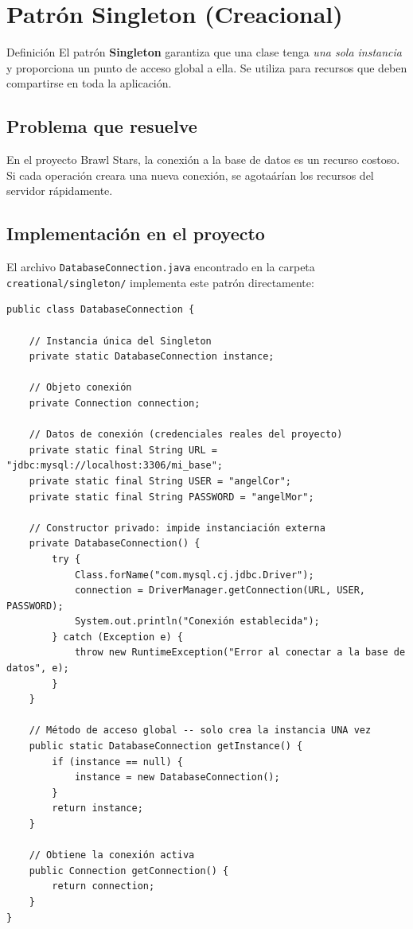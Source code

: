 \documentclass[12pt,a4paper]{article}
\begin{document}
\newpage
\section{Patr\'on Singleton (Creacional)}

\begin{patronbox}{Definici\'on}
El patr\'on \textbf{Singleton} garantiza que una clase tenga \textit{una sola instancia} y proporciona un punto de acceso global a ella. Se utiliza para recursos que deben compartirse en toda la aplicaci\'on.
\end{patronbox}

\subsection{Problema que resuelve}

En el proyecto Brawl Stars, la conexi\'on a la base de datos es un recurso costoso. Si cada operaci\'on creara una nueva conexi\'on, se agota\'ar\'ian los recursos del servidor r\'apidamente.

\subsection{Implementaci\'on en el proyecto}

El archivo \texttt{DatabaseConnection.java} encontrado en la carpeta \texttt{creational/singleton/} implementa este patr\'on directamente:

\begin{lstlisting}[caption={DatabaseConnection.java -- Singleton de conexi\'on a base de datos}]
public class DatabaseConnection {

    // Instancia única del Singleton
    private static DatabaseConnection instance;

    // Objeto conexión
    private Connection connection;

    // Datos de conexión (credenciales reales del proyecto)
    private static final String URL = "jdbc:mysql://localhost:3306/mi_base";
    private static final String USER = "angelCor";
    private static final String PASSWORD = "angelMor";

    // Constructor privado: impide instanciación externa
    private DatabaseConnection() {
        try {
            Class.forName("com.mysql.cj.jdbc.Driver");
            connection = DriverManager.getConnection(URL, USER, PASSWORD);
            System.out.println("Conexión establecida");
        } catch (Exception e) {
            throw new RuntimeException("Error al conectar a la base de datos", e);
        }
    }

    // Método de acceso global -- solo crea la instancia UNA vez
    public static DatabaseConnection getInstance() {
        if (instance == null) {
            instance = new DatabaseConnection();
        }
        return instance;
    }

    // Obtiene la conexión activa
    public Connection getConnection() {
        return connection;
    }
}
\end{lstlisting}
\end{document}
